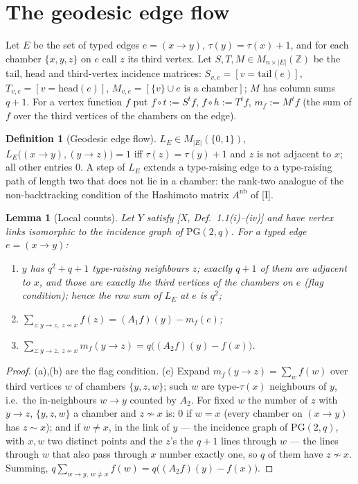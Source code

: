 \documentclass[11pt]{amsart}
\numberwithin{equation}{section}
\newtheorem{lemma}[theorem]{Lemma}
\theoremstyle{definition}
\newtheorem{definition}[theorem]{Definition}
\theoremstyle{remark}
\newcommand{\Z}{\mathbb{Z}}
\newcommand{\PG}{\mathrm{PG}}
\newcommand{\LE}{L_{E}}
\newcommand{\Anb}{A^{\mathrm{nb}}}
\begin{document}
\section{The geodesic edge flow}\label{sec:edge}

Let $E$ be the set of typed edges $e=(x\to y)$, $\tau(y)=\tau(x)+1$, and for each
chamber $\{x,y,z\}$ on $e$ call $z$ its third vertex. Let $S,T,M\in M_{n\times|E|}(\Z)$ be the
tail, head and third-vertex incidence matrices: $S_{v,e}=[v=\text{tail}(e)]$,
$T_{v,e}=[v=\text{head}(e)]$, $M_{v,e}=[\{v\}\cup e\text{ is a chamber}]$; $M$ has column
sums $q+1$. For a vertex function $f$ put $f\circ t:=S^{t}f$, $f\circ h:=T^{t}f$,
$m_f:=M^{t}f$ (the sum of $f$ over the third vertices of the chambers on the edge).

\begin{definition}[Geodesic edge flow]\label{def:LE}
$\LE\in M_{|E|}(\{0,1\})$, $\LE\bigl((x\to y),(y\to z)\bigr)=1$ iff $\tau(z)=\tau(y)+1$ and
$z$ is not adjacent to $x$; all other entries $0$. A step of $\LE$ extends a type-raising
edge to a type-raising path of length two that does not lie in a chamber: the rank-two
analogue of the non-backtracking condition of the Hashimoto matrix $\Anb$ of [I].
\end{definition}

\begin{lemma}[Local counts]\label{lem:local}
Let $Y$ satisfy {\rm[X, Def.~1.1(i)--(iv)]} and have vertex links isomorphic to the
incidence graph of $\PG(2,q)$. For a typed edge $e=(x\to y)$:
\begin{enumerate}
\item[(a)] $y$ has $q^{2}+q+1$ type-raising neighbours $z$; exactly $q+1$ of them are
adjacent to $x$, and those are exactly the third vertices of the chambers on $e$ (flag
condition); hence the row sum of $\LE$ at $e$ is $q^{2}$;
\item[(b)] $\sum_{z\colon y\to z,\ z\not\sim x}f(z)=(A_1f)(y)-m_f(e)$;
\item[(c)] $\sum_{z\colon y\to z,\ z\not\sim x}m_f(y\to z)=q\bigl((A_2f)(y)-f(x)\bigr)$.
\end{enumerate}
\end{lemma}

\begin{proof}
(a),(b) are the flag condition. (c) Expand $m_f(y\to z)=\sum_wf(w)$ over third vertices
$w$ of chambers $\{y,z,w\}$; such $w$ are type-$\tau(x)$ neighbours of $y$, i.e.\ the
in-neighbours $w\to y$ counted by $A_2$. For fixed $w$ the number of $z$ with $y\to z$,
$\{y,z,w\}$ a chamber and $z\not\sim x$ is: $0$ if $w=x$ (every chamber on $(x\to y)$ has
$z\sim x$); and if $w\ne x$, in the link of $y$ --- the incidence graph of $\PG(2,q)$, with
$x,w$ two distinct points and the $z$'s the $q+1$ lines through $w$ --- the lines through $w$
that also pass through $x$ number exactly one, so $q$ of them have $z\not\sim x$. Summing,
$q\sum_{w\to y,\,w\ne x}f(w)=q\bigl((A_2f)(y)-f(x)\bigr)$.
\end{proof}
\end{document}
